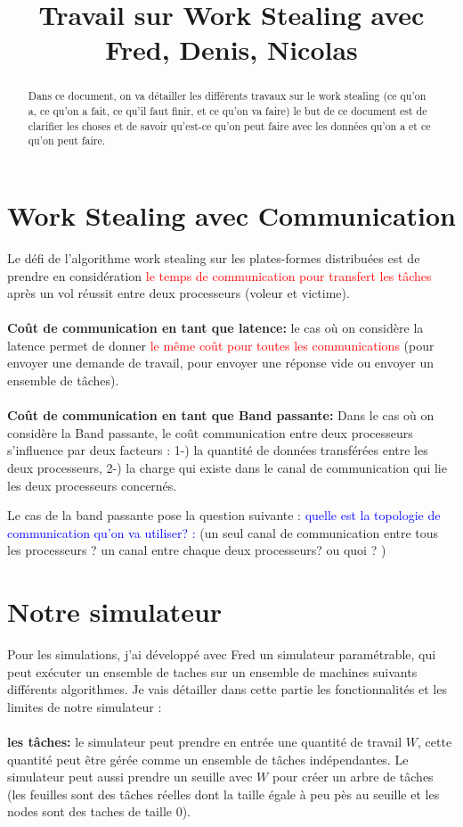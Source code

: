 \documentclass{article}
\title{Travail sur Work Stealing avec Fred, Denis, Nicolas}
\begin{document}
\maketitle{}
   \begin{abstract}
       Dans ce document, on va détailler les différents travaux sur le work stealing
       (ce qu'on a, ce qu'on a fait, ce qu'il faut finir, et ce qu'on va faire)
       le but de ce document est de clarifier les choses et de savoir qu'est-ce qu'on peut faire avec les données qu'on a et ce qu'on peut faire.
   \end{abstract}



   \section{Work Stealing avec Communication}

   Le défi de l'algorithme work stealing sur les plates-formes distribuées est de prendre en considération
   \textcolor{red}{le temps de communication pour transfert les tâches} après un vol réussit entre deux processeurs (voleur et victime).
   \\\\
   \textbf{Coût de communication en tant que latence:}
   le cas où on considère la latence permet de donner \textcolor{red}{le même coût pour toutes les communications}
   (pour envoyer une demande de travail, pour envoyer une réponse vide ou envoyer un ensemble de tâches).
   \\\\
   \textbf{Coût de communication en tant que Band passante:}
   Dans le cas où on considère la Band passante, le coût communication entre deux processeurs s'influence par deux facteurs :
   1-) la quantité de données transférées entre les deux processeurs,
   2-) la charge qui existe dans le canal de communication qui lie les deux processeurs concernés.

    Le cas de la band passante pose la question suivante :
    \textcolor{blue}{quelle est la topologie de communication qu'on va utiliser? :}
    (un seul canal de communication entre tous les processeurs ? un canal entre chaque deux processeurs? ou quoi ? )


   \section{Notre simulateur}
    Pour les simulations, j'ai développé avec Fred un simulateur paramétrable,
    qui peut exécuter un ensemble de taches sur un ensemble de machines suivants différents algorithmes.
    Je vais détailler dans cette partie les fonctionnalités et les limites de notre simulateur :
\\\\
    \textbf{les tâches:} le simulateur peut prendre en entrée une quantité de travail $W$,
    cette quantité peut être gérée comme un ensemble de tâches indépendantes.
    Le simulateur peut aussi prendre un seuille avec $W$ pour créer un arbre de tâches
    (les feuilles sont des tâches réelles dont la taille égale à peu pès au seuille et les nodes sont des taches de taille 0).
\end{document}
